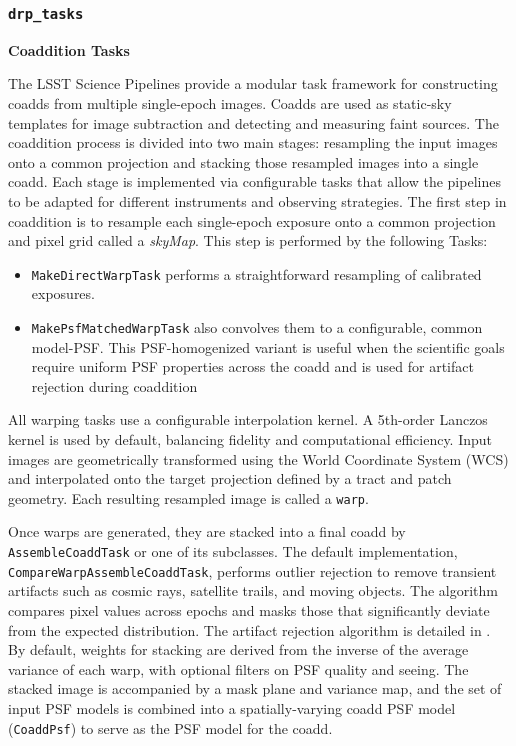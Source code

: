 \subsubsection{\texttt{drp\_tasks}}

\textbf{Coaddition Tasks}
\label{sec:coaddition-tasks}

The LSST Science Pipelines provide a modular task framework for constructing coadds from multiple single-epoch images.
Coadds are used as static-sky templates for image subtraction and detecting and measuring faint sources.
The coaddition process is divided into two main stages: resampling the input images onto a common projection and stacking those resampled images into a single coadd.
Each stage is implemented via configurable tasks that allow the pipelines to be adapted for different instruments and observing strategies.
The first step in coaddition is to resample each single-epoch exposure onto a common projection and pixel grid called a \textit{skyMap}.
This step is performed by the following Tasks: 
\begin{itemize}
\item \texttt{MakeDirectWarpTask} performs a straightforward resampling of calibrated exposures.
 \item \texttt{MakePsfMatchedWarpTask} also convolves them to a configurable, common model-PSF.
 This PSF-homogenized variant is useful when the scientific goals require uniform PSF properties across the coadd and is used for artifact rejection during coaddition
 \end{itemize}

All warping tasks use a configurable interpolation kernel. A 5th-order Lanczos kernel is used by default, balancing fidelity and computational efficiency.
Input images are geometrically transformed using the World Coordinate System (WCS) and interpolated onto the target projection defined by a tract and patch geometry.
Each resulting resampled image is called a \texttt{warp}.

Once warps are generated, they are stacked into a final coadd by \texttt{AssembleCoaddTask} or one of its subclasses.
The default implementation, \texttt{CompareWarpAssembleCoaddTask}, performs outlier rejection to remove transient artifacts such as cosmic rays, satellite trails, and moving objects.
The algorithm compares pixel values across epochs and masks those that significantly deviate from the expected distribution.
The artifact rejection algorithm is detailed in \citep{DMTN-080}.
By default, weights for stacking are derived from the inverse of the average variance of each warp, with optional filters on PSF quality and seeing.
The stacked image is accompanied by a mask plane and variance map, and the set of input PSF models is combined into a spatially-varying coadd PSF model (\texttt{CoaddPsf}) to serve as the PSF model for the coadd. 

